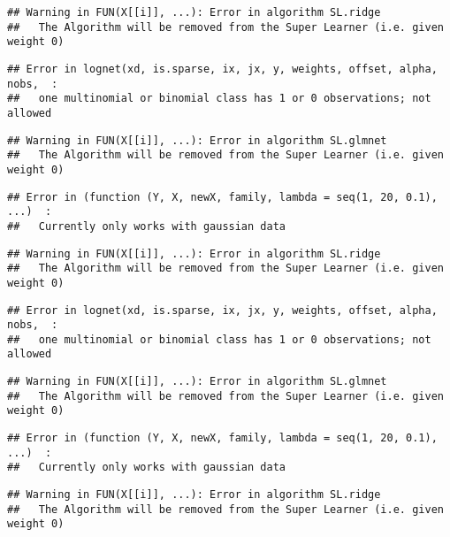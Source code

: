 \documentclass[
]{article}
\begin{document}
\begin{verbatim}
## Warning in FUN(X[[i]], ...): Error in algorithm SL.ridge 
##   The Algorithm will be removed from the Super Learner (i.e. given weight 0)
\end{verbatim}

\begin{verbatim}
## Error in lognet(xd, is.sparse, ix, jx, y, weights, offset, alpha, nobs,  : 
##   one multinomial or binomial class has 1 or 0 observations; not allowed
\end{verbatim}

\begin{verbatim}
## Warning in FUN(X[[i]], ...): Error in algorithm SL.glmnet 
##   The Algorithm will be removed from the Super Learner (i.e. given weight 0)
\end{verbatim}

\begin{verbatim}
## Error in (function (Y, X, newX, family, lambda = seq(1, 20, 0.1), ...)  : 
##   Currently only works with gaussian data
\end{verbatim}

\begin{verbatim}
## Warning in FUN(X[[i]], ...): Error in algorithm SL.ridge 
##   The Algorithm will be removed from the Super Learner (i.e. given weight 0)
\end{verbatim}

\begin{verbatim}
## Error in lognet(xd, is.sparse, ix, jx, y, weights, offset, alpha, nobs,  : 
##   one multinomial or binomial class has 1 or 0 observations; not allowed
\end{verbatim}

\begin{verbatim}
## Warning in FUN(X[[i]], ...): Error in algorithm SL.glmnet 
##   The Algorithm will be removed from the Super Learner (i.e. given weight 0)
\end{verbatim}

\begin{verbatim}
## Error in (function (Y, X, newX, family, lambda = seq(1, 20, 0.1), ...)  : 
##   Currently only works with gaussian data
\end{verbatim}

\begin{verbatim}
## Warning in FUN(X[[i]], ...): Error in algorithm SL.ridge 
##   The Algorithm will be removed from the Super Learner (i.e. given weight 0)
\end{verbatim}
\end{document}
